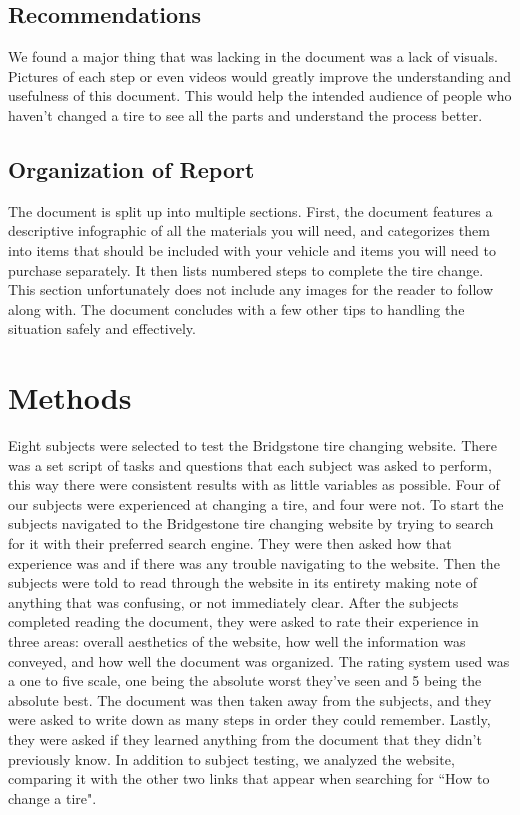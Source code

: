 \documentclass[12pt,A4paper]{article}
\begin{document}
		\subsection{Recommendations}
		We found a major thing that was lacking in the document was a lack of visuals. Pictures of each step or even videos would greatly improve the understanding and usefulness of this document. This would help the intended audience of people who haven't changed a tire to see all the parts and understand the process better.

		\subsection{Organization of Report}
		The document is split up into multiple sections. First, the document features a descriptive infographic of all the materials you will need, and categorizes them into items that should be included with your vehicle and items you will need to purchase separately. It then lists numbered steps to complete the tire change. This section unfortunately does not include any images for the reader to follow along with. The document concludes with a few other tips to handling the situation safely and effectively.

	\section{Methods}
	Eight subjects were selected to test the Bridgstone tire changing website. There was a set script of tasks and questions that each subject was asked to perform, this way there were consistent results with as little variables as possible. Four of our subjects were experienced at changing a tire, and four were not. To start the subjects navigated to the Bridgestone tire changing website by trying to search for it with their preferred search engine. They were then asked how that experience was and if there was any trouble navigating to the website. Then the subjects were told to read through the website in its entirety making note of anything that was confusing, or not immediately clear. After the subjects completed reading the document, they were asked to rate their experience in three areas: overall aesthetics of the website, how well the information was conveyed, and how well the document was organized. The rating system used was a one to five scale, one being the absolute worst they’ve seen and 5 being the absolute best. The document was then taken away from the subjects, and they were asked to write down as many steps in order they could remember. Lastly, they were asked if they learned anything from the document that they didn’t previously know. In addition to subject testing, we analyzed the website, comparing it with the other two links that appear when searching for “How to change a tire". 
	\vspace{1.6 in}
\end{document}
